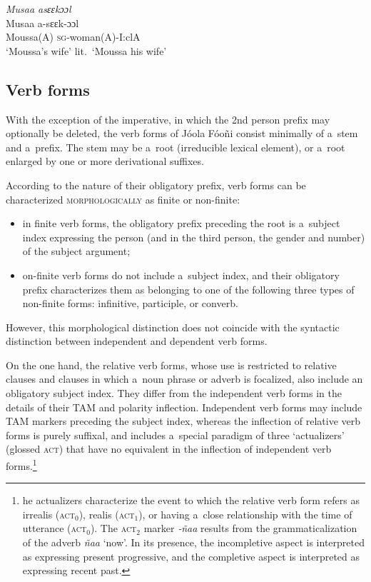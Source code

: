 \documentclass[output=paper]{langscibook}
\begin{document}
    \ex\label{ex:Creissels:8b}
    
      \textit{Musaa asɛɛkɔɔl}\\
      \gll Musaa a-sɛɛk-ɔɔl\\
      Moussa(A) \textsc{sg}-woman(A)-I:clA\\
      \glt `Moussa's wife' lit.\ `Moussa his wife'

  \z
\z

\subsection{Verb forms}%
\label{sec:Creissels:verb-forms}

With the exception of the imperative, in which the 2nd person prefix may
optionally be deleted, the verb forms of Jóola Fóoñi consist minimally of
a~stem and a~prefix.  The stem may be a~root (irreducible lexical element), or
a~root enlarged by one or more derivational suffixes.

According to the nature of their obligatory prefix, verb forms can be
characterized \textsc{morphologically} as finite or non-finite:

\begin{itemize}
\item in finite verb forms, the obligatory prefix preceding the root is
  a~subject index expressing the person (and in the third person, the gender
  and number) of the subject argument;
\item on-finite verb forms do not include a~subject index, and their obligatory
  prefix characterizes them as belonging to one of the following three types of
  non-finite forms: infinitive, participle, or converb.
\end{itemize}

However, this morphological distinction does not coincide with the syntactic
distinction between independent and dependent verb forms.

On the one hand, the relative verb forms, whose use is restricted to relative
clauses and clauses in which a~noun phrase or adverb is focalized, also include
an obligatory subject index.  They differ from the independent verb forms in
the details of their TAM and polarity inflection.  Independent verb forms may
include TAM markers preceding the subject index, whereas the inflection of
relative verb forms is purely suffixal, and includes a~special paradigm of
three `actualizers' (glossed \textsc{act}) that have no equivalent in the
inflection of independent verb forms.\footnote{ he actualizers characterize the
  event to which the relative verb form refers as irrealis (\textsc{act}$_0$),
  realis (\textsc{act}$_1$), or having a~close relationship with the time of
  utterance (\textsc{act}$_0$).  The \textsc{act}$_2$ marker \textit{‑ñaa}
  results from the grammaticalization of the adverb \textit{ñaa} `now'.  In its
  presence, the incompletive aspect is interpreted as expressing present
  progressive, and the completive aspect is interpreted as expressing recent
  past. }
\end{document}

